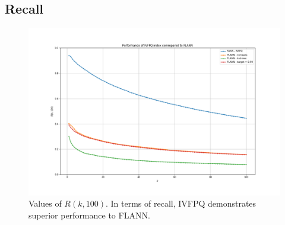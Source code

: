 \subsection{Recall}

\begin{frame}

\begin{figure}
\centering
\includegraphics[width=0.9\linewidth]{../images/ivfpq/comparison}
\caption{Values of $R(k, 100)$. In terms of recall, IVFPQ demonstrates superior performance to FLANN.}
\label{fig:comparison}
\end{figure}

\end{frame}